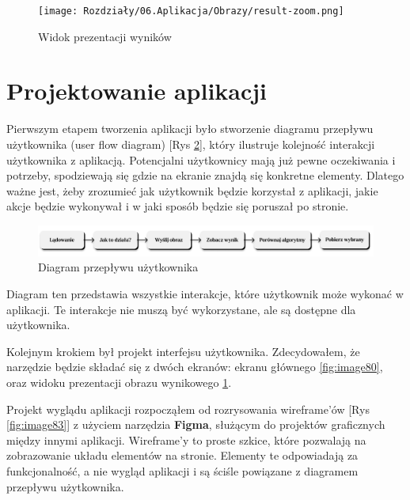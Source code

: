 \begin{figure}[ht]
    \centering
    \begin{minipage}[t]{0.85\linewidth}
        \texttt{[image: Rozdziały/06.Aplikacja/Obrazy/result-zoom.png]}  
        \caption{Widok prezentacji wyników}
        \label{fig:image81}
    \end{minipage}
\end{figure}

\newpage
\section{Projektowanie aplikacji}

Pierwszym etapem tworzenia aplikacji było stworzenie diagramu przepływu użytkownika (user flow diagram) [Rys \ref{fig:image82}], który ilustruje kolejność interakcji użytkownika z aplikacją. Potencjalni użytkownicy mają już pewne oczekiwania i potrzeby, spodziewają się gdzie na ekranie znajdą się konkretne elementy. Dlatego ważne jest, żeby zrozumieć jak użytkownik będzie korzystał z aplikacji, jakie akcje będzie wykonywał i w jaki sposób będzie się poruszał po stronie.

\begin{figure}[ht]
    \centering
    \begin{minipage}[t]{0.99\linewidth}
        \includegraphics[width=\linewidth]{Rozdziały/06.Aplikacja/Obrazy/user-flow.png}  
        \caption{Diagram przepływu użytkownika}
        \label{fig:image82}
    \end{minipage}
\end{figure}

Diagram ten przedstawia wszystkie interakcje, które użytkownik może wykonać w aplikacji. Te interakcje nie muszą być wykorzystane, ale są dostępne dla użytkownika.

Kolejnym krokiem był projekt interfejsu użytkownika. Zdecydowałem, że narzędzie będzie składać się z dwóch ekranów: ekranu głównego \ref{fig:image80}, oraz widoku prezentacji obrazu wynikowego \ref{fig:image81}.

Projekt wyglądu aplikacji rozpocząłem od rozrysowania wireframe'ów [Rys \ref{fig:image83}] z użyciem narzędzia \textbf{Figma}, służącym do projektów graficznych między innymi aplikacji. Wireframe'y to proste szkice, które pozwalają na zobrazowanie układu elementów na stronie. Elementy te odpowiadają za funkcjonalność, a nie wygląd aplikacji i są ściśle powiązane z diagramem przepływu użytkownika.

